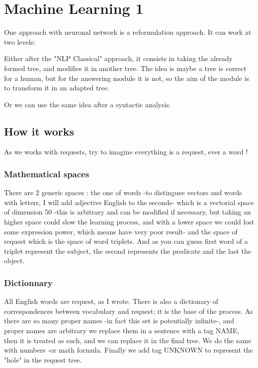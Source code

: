 \section{Machine Learning 1}

One approach with neuronal network is a reformulation approach. It can work at two levels: 

Either after the "NLP Classical" approach, it consists in taking the already formed tree, and modifies it in another tree. The idea is maybe a tree is correct for a human, but for the answering module it is not, so the aim of the module is to transform it in an adapted tree.

Or we can use the same idea after a syntactic analysis. 

\subsection{How it works}

As we works with requests, try to imagine everything is a request, ever a word !

\subsubsection{Mathematical spaces}

There are 2 generic spaces : the one of words -to distinguee vectors and words with letters, I will add adjective English to the seconds- which is a vectorial space of dimension 50 -this is arbitrary and can be modified if necessary, but taking an higher space could slow the learning process, and with a lower space we could lost some expression power, which means have very poor result- and the space of request which is the space of word triplets. And as you can guess first word of a triplet represent the subject, the second represents the predicate and the last the object.

\subsubsection{Dictionnary}

All English words are request, as I wrote. There is also a dictionary of correspondences between vocabulary and request; it is the base of the process. As there are so many proper names -in fact this set is potentially infinite-, and proper names are arbitrary we replace them in a sentence with a tag NAME, then it is treated as such, and we can replace it in the final tree. We do the same with numbers -or math formula. Finally we add tag UNKNOWN to represent the "hole" in the request tree.

